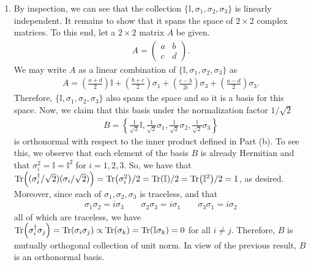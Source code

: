 \documentclass{article}
\theoremstyle{definition}
\newcommand{\f}[2]{\frac{#1}{#2}}
\newcommand{\lp}{\left(}
\newcommand{\rp}{\right)}
\newcommand{\lc}{\left\{}
\newcommand{\rc}{\right\}}
\begin{document}
\begin{enumerate}[label = (\alph*)]
	\item By inspection, we can see that the collection $\{ \mathbb{I}, \sigma_1,\sigma_2,\sigma_3\}$ is linearly independent. It remains to show that it spans the space of $2\times 2$ complex matrices. To this end, let a $2\times 2$ matrix $A$ be given. 
	\begin{align*}
	A = \begin{pmatrix}
	a & b \\ c & d
	\end{pmatrix}.
	\end{align*} 
	We may write $A$ as a linear combination of $\{ \mathbb{I}, \sigma_1, \sigma_2,\sigma_3 \}$ as 
	\begin{align*}
	A = \lp \f{a+d}{2} \rp \mathbb{I} + \lp \f{b+c}{2} \rp \sigma_1 + \lp \f{c-b}{2i} \rp \sigma_3 + \lp \f{a-d}{2} \rp \sigma_3.
	\end{align*}
	Therefore, $\{ \mathbb{I},\sigma_1,\sigma_2,\sigma_3 \}$ also spans the space and so it is a basis for this space. Now, we claim that this basis under the normalization factor $1/\sqrt{2}$
	\begin{align*}
	B = \lc \f{1}{\sqrt{2}}\mathbb{I}, \f{1}{\sqrt{2}}\sigma_1, \f{1}{\sqrt{2}}\sigma_2, \f{1}{\sqrt{2}}\sigma_3 \rc
	\end{align*}
	is orthonormal with respect to the inner product defined in Part (b). To see this, we observe that each element of the basis $B$ is already Hermitian and that $\sigma_i^2 = \mathbb{I} = \mathbb{I}^2$ for $i=1,2,3$. So, we have that $\Tr((\sigma_i^\dagger/\sqrt{2})( \sigma_i/\sqrt{2}) ) = \Tr(\sigma_i^2)/2 = \Tr(\mathbb{I})/2 = \Tr(\mathbb{I}^2)/2 = 1$, as desired. Moreover, since each of $\sigma_1,\sigma_2,\sigma_3$ is traceless, and that
	\begin{align*}
	\sigma_1\sigma_2 = i\sigma_3 \quad\quad \sigma_2\sigma_3 = i\sigma_1\quad\quad \sigma_3\sigma_1 = i\sigma_2
	\end{align*} 
	all of which are traceless, we have $\Tr(\sigma_i^\dagger \sigma_j)= \Tr(\sigma_i\sigma_j) \propto  \Tr(\sigma_k) = \Tr(\mathbb{I}\sigma_k) = 0$ for all $i\neq j$. Therefore, $B$ is mutually orthogonal collection of unit norm. In view of the previous result, $B$ is an orthonormal basis. 
	

\end{enumerate}
\end{document}
